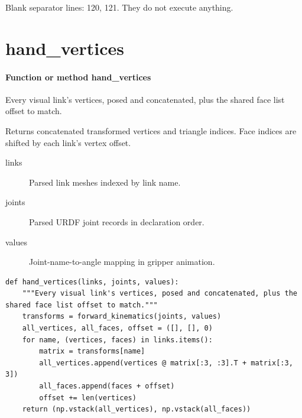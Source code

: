 \documentclass[11pt,a4paper]{book}
\begin{document}
Blank separator lines: 120, 121. They do not execute anything.

\section{hand\_vertices}

\paragraph{Function or method hand\_vertices}
Every visual link's vertices, posed and concatenated, plus the shared face list offset to match.

Returns concatenated transformed vertices and triangle indices. Face indices are shifted by each link's vertex offset.

\begin{description}
\item[links] Parsed link meshes indexed by link name.
\item[joints] Parsed URDF joint records in declaration order.
\item[values] Joint-name-to-angle mapping in gripper animation.
\end{description}

\begin{lstlisting}[firstnumber=122]
def hand_vertices(links, joints, values):
    """Every visual link's vertices, posed and concatenated, plus the shared face list offset to match."""
    transforms = forward_kinematics(joints, values)
    all_vertices, all_faces, offset = ([], [], 0)
    for name, (vertices, faces) in links.items():
        matrix = transforms[name]
        all_vertices.append(vertices @ matrix[:3, :3].T + matrix[:3, 3])
        all_faces.append(faces + offset)
        offset += len(vertices)
    return (np.vstack(all_vertices), np.vstack(all_faces))


\end{lstlisting}
\end{document}

